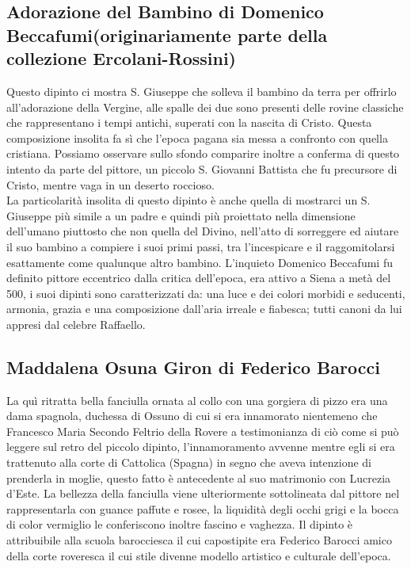 \documentclass[hidelinks,12pt,a4paper]{article}
\begin{document}
\begin{flushleft}
		\subsection{Adorazione del Bambino di Domenico Beccafumi(originariamente parte della collezione Ercolani-Rossini)}
		Questo dipinto ci mostra S. Giuseppe che solleva il bambino da terra per offrirlo all'adorazione della Vergine, alle spalle dei due sono presenti delle rovine classiche che rappresentano i tempi antichi, superati con la nascita di Cristo. Questa composizione insolita fa sì che l'epoca pagana sia messa a confronto con quella cristiana. Possiamo osservare sullo sfondo comparire inoltre a conferma di questo intento da parte del pittore, un piccolo S. Giovanni Battista che fu precursore di Cristo, mentre vaga in un deserto roccioso.\\
		La particolarità insolita di questo dipinto è anche quella di mostrarci un S. Giuseppe più simile a un padre e quindi più proiettato nella dimensione dell'umano piuttosto che non quella del Divino, nell'atto di sorreggere ed aiutare il suo bambino a compiere i suoi primi passi, tra l'incespicare e il raggomitolarsi esattamente come qualunque altro bambino. L'inquieto Domenico Beccafumi fu definito pittore eccentrico dalla critica dell'epoca, era attivo a Siena a metà del 500, i suoi dipinti sono caratterizzati da: una luce e dei colori morbidi e seducenti, armonia, grazia e una composizione dall'aria irreale e fiabesca; tutti canoni da lui appresi dal celebre Raffaello.
		
		\subsection{Maddalena Osuna Giron di Federico Barocci}
		La quì ritratta bella fanciulla ornata al collo con una gorgiera di pizzo era una dama spagnola, duchessa di Ossuno di cui si era innamorato nientemeno che Francesco Maria Secondo Feltrio della Rovere a testimonianza di ciò  come si può leggere sul retro del piccolo dipinto, l'innamoramento avvenne mentre egli si era trattenuto alla corte di Cattolica (Spagna) in segno che aveva intenzione di prenderla in moglie, questo fatto è antecedente al suo matrimonio con Lucrezia d'Este. La bellezza della fanciulla viene ulteriormente sottolineata dal pittore nel rappresentarla con guance paffute e rosee, la liquidità degli occhi grigi e la bocca di color vermiglio le conferiscono inoltre fascino e vaghezza. Il dipinto è attribuibile alla scuola barocciesca il cui capostipite era Federico Barocci amico della corte roveresca il cui stile divenne modello artistico e culturale dell'epoca.
		

\end{flushleft}
\end{document}
